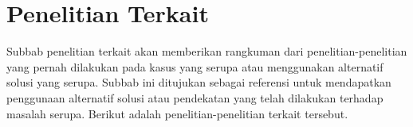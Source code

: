 \section{Penelitian Terkait}
\label{sec:penelitianterkait}

Subbab penelitian terkait akan memberikan rangkuman dari penelitian-penelitian yang pernah dilakukan pada kasus yang serupa atau menggunakan alternatif solusi yang serupa. Subbab ini ditujukan sebagai referensi untuk mendapatkan penggunaan alternatif solusi atau pendekatan yang telah dilakukan  terhadap masalah serupa. Berikut adalah penelitian-penelitian terkait tersebut. 



